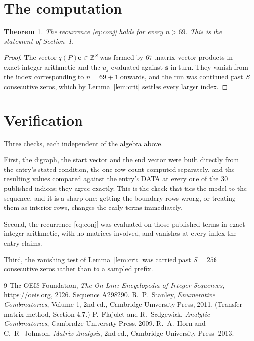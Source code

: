 \documentclass[11pt,a4paper]{article}
\theoremstyle{plain}
\newtheorem{theorem}{Theorem}
\theoremstyle{definition}
\begin{document}
\section{The computation}

\begin{theorem}
The recurrence \eqref{eq:conj} holds for every $n>69$. This is the statement of
Section~1.
\end{theorem}

\begin{proof}
The vector $q(P)\mathbf{e}\in\mathbb{Z}^{S}$ was formed by $67$ matrix--vector
products in exact integer arithmetic and the $u_j$ evaluated against $\mathbf{s}$ in turn.
They vanish from the index corresponding to $n=69+1$ onwards, and the run was continued
past $S$ consecutive zeros, which by Lemma~\ref{lem:crit} settles every larger index.
\end{proof}

\section{Verification}

Three checks, each independent of the algebra above.

First, the digraph, the start vector and the end vector were built directly from the
entry's stated condition, the one-row count computed separately, and the resulting values
compared against the entry's DATA at every one of the $30$ published indices; they
agree exactly. This is the check that ties the model to the sequence, and it is a sharp one:
getting the boundary rows wrong, or treating them as interior rows, changes the early terms
immediately.

Second, the recurrence \eqref{eq:conj} was evaluated on those published terms in exact
integer arithmetic, with no matrices involved, and vanishes at every index the entry claims.

Third, the vanishing test of Lemma~\ref{lem:crit} was carried past $S=256$ consecutive
zeros rather than to a sampled prefix.

\begin{thebibliography}{9}
 The OEIS Foundation, \emph{The On-Line Encyclopedia of Integer
Sequences}, \url{https://oeis.org}, 2026. Sequence A298290.
 R.~P.~Stanley, \emph{Enumerative Combinatorics}, Volume 1, 2nd ed.,
Cambridge University Press, 2011. (Transfer-matrix method, Section 4.7.)
 P.~Flajolet and R.~Sedgewick, \emph{Analytic Combinatorics}, Cambridge
University Press, 2009.
 R.~A.~Horn and C.~R.~Johnson, \emph{Matrix Analysis}, 2nd ed., Cambridge
University Press, 2013.
\end{thebibliography}
\end{document}
